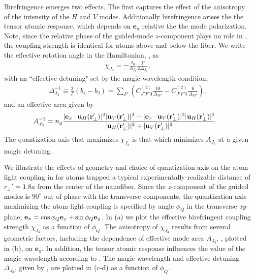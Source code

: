 \documentclass[preprint,aps,pra,onecolumn]{revtex4-1} %
\newcommand{\qaxis}{\mathbf{e}_\pi}
\begin{document}
Birefringence emerges two effects.  The first captures the effect of the anisotropy of the intensity of the $H$ and $V$ modes.  
Additionally birefringence arises the the tensor atomic response, which depends on $\mathbf{e}_\pi$ relative the the mode polarization. 
Note,  since the relative phase of the guided-mode $z$-component plays no role in , the coupling strength is identical for atoms above and below the fiber.  
We write the effective rotation angle in the Hamiltonian, , as
	\begin{align} \label{Eq::chieff}
		\chi_{J_3} = - \frac{\sigma_0}{A_{J_3}} \frac{\Gamma}{ 2 \Delta_{J_3}},
	\end{align}
with an ``effective detuning" set by the magic-wavelength condition,
	\begin{align} \label{Eq::SqueezingEffectiveDetuning}
		 \Delta_{J_3}^{-1} \equiv \frac{2}{\Gamma} (b_4 - b_3) =   \sum_{F'}  \left( C^{(2)}_{J'F'4}\frac{10}{\Delta_{4F'}} -  C^{(2)}_{J'F'3}\frac{6}{ \Delta_{3F'} } \right),
	\end{align}
and an effective area given by
	\begin{align} \label{Eq::SqueezingModeArea}
		A_{J_3}^{-1} & = n_g \frac{ |\mathbf{e}_\pi \cdot \mathbf{u}_H(\mathbf{r}'_\perp) |^2 |\mathbf{u}_V(\mathbf{r}'_\perp)|^2 - |\mathbf{e}_\pi \cdot \mathbf{u}_V(\mathbf{r}'_\perp)|^2 |\mathbf{u}_H(\mathbf{r}'_\perp)|^2}{ |\mathbf{u}_H(\mathbf{r}'_\perp)|^2 + |\mathbf{u}_V(\mathbf{r}'_\perp)|^2 } 
	\end{align}	
The quantization axis that maximizes $\chi_{J_3}$ is that which minimizes $A_{J_3}$ at a given magic detuning.  

We illustrate the effects of geometry and choice of quantization axis on the atom-light coupling in   for atoms trapped a typical experimentally-realizable \cite{} distance of $r_\perp'=1.8a$ from the center of the nanofiber. 
Since the $z$-component of the guided modes is $90^\circ$ out of phase with the transverse components, the quantization axis maximizing the atom-light coupling is specified by angle $\phi_Q$ in the transverse \emph{xy}-plane, $\qaxis = \cos \phi_Q \mbf{e}_x + \sin \phi_Q \mbf{e}_y$. 
In (a) we plot the effective birefringent coupling strength $\chi_{J_3}$ as a function of $\phi_Q$. The anisotropy of $\chi_{J_3}$ results from several geometric factors, including the dependence of effective mode area $A_{J_3}$, , plotted in (b), on $\mathbf{e}_\pi$. In addition, the tensor atomic response influences the value of the magic wavelength according to . 
The magic wavelength and effective detuning $\Delta_{J_3}$, given by , are plotted in (c-d) as a function of $\phi_Q$.  
\end{document}
